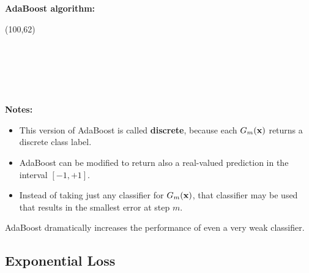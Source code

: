  \textbf {AdaBoost algorithm:}
%
  \begin{centernss}
    \small
      \begin{struktogramm}(100,62)\\
        \\
          \\
          \\
          \\
          \\
        \untilend
      \end{struktogramm}
    
  \end{centernss}
 \textbf {Notes:}
  \begin{itemize}
    \item This version of AdaBoost is called \textbf {discrete}, because each $G_m(\bm{\mathrm{x}})$ returns a discrete class label. %
    \item AdaBoost can be modified to return also a real-valued prediction in the interval $[-1,+1]$.  %
    \item Instead of taking just any classifier for $G_m(\bm{\mathrm{x}})$, that classifier may be used that results in the smallest error at step $m$.
  \end{itemize}

  AdaBoost dramatically increases the performance of even a very weak classifier.
 
\subsection{Exponential Loss}


